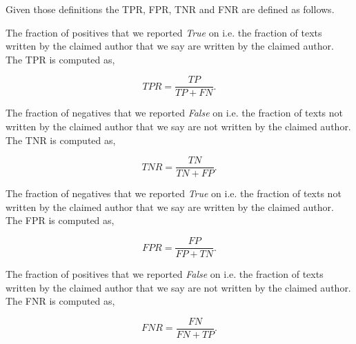 Given those definitions the \gls{TPR}, \gls{FPR}, \gls{TNR} and \gls{FNR}
are defined as follows.

\begin{definition}

    The fraction of positives that we reported \textit{True} on i.e. the
    fraction of texts written by the claimed author that we say are written by
    the claimed author. The \gls{TPR} is computed as,

    \begin{equation}
        TPR = \frac{TP}{TP + FN}.
    \end{equation}

\end{definition}

\begin{definition}

    The fraction of negatives that we reported \textit{False} on i.e. the
    fraction of texts not written by the claimed author that we say are not
    written by the claimed author. The \gls{TNR} is computed as,

    \begin{equation}
        TNR = \frac{TN}{TN + FP}.
    \end{equation}

\end{definition}

\begin{definition}

        The fraction of negatives that we reported \textit{True} on i.e. the
        fraction of texts not written by the claimed author that we say are
        written by the claimed author. The \gls{FPR} is computed as,

        \begin{equation}
            FPR = \frac{FP}{FP + TN}.
        \end{equation}

\end{definition}

\begin{definition}

    The fraction of positives that we reported \textit{False} on i.e. the
    fraction of texts written by the claimed author that we say are not written
    by the claimed author. The \gls{FNR} is computed as,

    \begin{equation}
        FNR = \frac{FN}{FN + TP}.
    \end{equation}

\end{definition}

